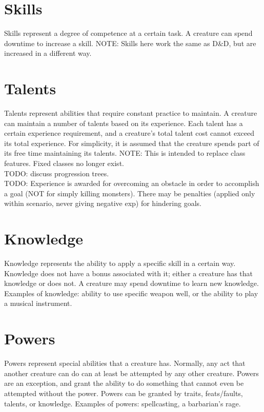 \documentclass[letterpaper,titlepage,openany,twocolumn]{book}
\begin{document}
\section{Skills}
Skills represent a degree of competence at a certain task. A creature can spend downtime to increase a skill. NOTE: Skills here work the same as D\&D, but are increased in a different way.\\

\section{Talents}
Talents represent abilities that require constant practice to maintain. A creature can maintain a number of talents based on its experience. Each talent has a certain experience requirement, and a creature’s total talent cost cannot exceed its total experience. For simplicity, it is assumed that the creature spends part of its free time maintaining its talents. NOTE: This is intended to replace class features. Fixed classes no longer exist.\\
TODO: discuss progression trees.\\
TODO: Experience is awarded for overcoming an obstacle in order to accomplish a goal (NOT for simply killing monsters). There may be penalties (applied only within scenario, never giving negative exp) for hindering goals.\\

\section{Knowledge}
Knowledge represents the ability to apply a specific skill in a certain way. Knowledge does not have a bonus associated with it; either a creature has that knowledge or does not. A creature may spend downtime to learn new knowledge. Examples of knowledge: ability to use specific weapon well, or the ability to play a musical instrument.\\

\section{Powers}
Powers represent special abilities that a creature has. Normally, any act that another creature can do can at least be attempted by any other creature. Powers are an exception, and grant the ability to do something that cannot even be attempted without the power. Powers can be granted by traits, feats/faults, talents, or knowledge. Examples of powers: spellcasting, a barbarian’s rage.\\
\end{document}
